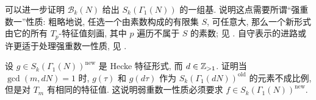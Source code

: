 \begin{remark}[强重数一性质]\label{rem:newform-mult1} 
	可以进一步证明 $\mathcal{B}_k(N)$ 给出 $S_k(\Gamma_1(N))$ 的一组基. 说明这点需要所谓``强重数一''性质: 粗略地说, 任选一个由素数构成的有限集 $S$, 可任意大, 那么一个新形式由它的所有 $T_p$-特征值刻画, 其中 $p$ 遍历不属于 $S$ 的素数; 见 \cite[Theorem 4.6.19]{Mi89}. 自守表示的进路或许更适于处理强重数一性质, 见 \cite{Del73, JS81-1}.
\end{remark}

\begin{exercise}
	设 $g \in S_k(\Gamma_1(N))^{\mathrm{new}}$ 是 Hecke 特征形式, 而 $d \in \mathbb{Z}_{>1}$. 证明当 $\gcd(m, dN) = 1$ 时, $g(\tau)$ 和 $g(d\tau)$ 作为 $S_k(\Gamma_1(dN))^{\mathrm{old}}$ 的元素不成比例, 但是对 $T_m$ 有相同的特征值. 这说明弱重数一性质必须要求 $f \in S_k(\Gamma_1(N))^{\mathrm{new}}$.
\end{exercise}
